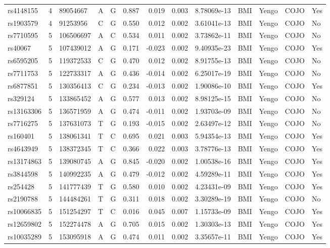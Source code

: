 \documentclass[11pt,twoside]{bristolthesis}
\begin{document}
\begin{longtable}[t]{lrlllrrrlllll}
rs4148155 & 4 & 89054667 & A & G & 0.887 & 0.019 & 0.003 & 8.78069e-13 & BMI & Yengo & COJO & Yes\\
rs1903579 & 4 & 91253956 & C & G & 0.550 & 0.012 & 0.002 & 3.61041e-13 & BMI & Yengo & COJO & No\\
\addlinespace
rs7710595 & 5 & 106506697 & A & C & 0.534 & 0.011 & 0.002 & 3.73862e-11 & BMI & Yengo & COJO & No\\
rs40067 & 5 & 107439012 & A & G & 0.171 & -0.023 & 0.002 & 9.40935e-23 & BMI & Yengo & COJO & Yes\\
rs6595205 & 5 & 119372533 & C & G & 0.470 & 0.012 & 0.002 & 8.91755e-13 & BMI & Yengo & COJO & No\\
rs7711753 & 5 & 122733317 & A & G & 0.436 & -0.014 & 0.002 & 6.25017e-19 & BMI & Yengo & COJO & No\\
rs6877851 & 5 & 130356413 & C & G & 0.234 & -0.013 & 0.002 & 1.90086e-10 & BMI & Yengo & COJO & Yes\\
\addlinespace
rs329124 & 5 & 133865452 & A & G & 0.577 & 0.013 & 0.002 & 8.98125e-15 & BMI & Yengo & COJO & No\\
rs13163306 & 5 & 136571959 & A & G & 0.474 & -0.011 & 0.002 & 1.93703e-09 & BMI & Yengo & COJO & No\\
rs7716275 & 5 & 137631073 & T & G & 0.193 & -0.015 & 0.002 & 2.63497e-12 & BMI & Yengo & COJO & No\\
rs160401 & 5 & 138061341 & T & C & 0.695 & 0.021 & 0.003 & 5.94354e-13 & BMI & Yengo & COJO & Yes\\
rs4643949 & 5 & 138372345 & T & C & 0.366 & 0.022 & 0.003 & 3.78776e-13 & BMI & Yengo & COJO & Yes\\
\addlinespace
rs13174863 & 5 & 139080745 & A & G & 0.845 & -0.020 & 0.002 & 1.00538e-16 & BMI & Yengo & COJO & Yes\\
rs3844598 & 5 & 140992235 & A & G & 0.479 & -0.012 & 0.002 & 4.59289e-11 & BMI & Yengo & COJO & Yes\\
rs254428 & 5 & 141777439 & T & G & 0.580 & 0.010 & 0.002 & 4.23431e-09 & BMI & Yengo & COJO & Yes\\
rs2190788 & 5 & 144484261 & T & G & 0.311 & 0.018 & 0.002 & 3.30289e-19 & BMI & Yengo & COJO & No\\
rs10066835 & 5 & 151254297 & T & C & 0.016 & 0.045 & 0.007 & 1.15733e-09 & BMI & Yengo & COJO & Yes\\
\addlinespace
rs12659802 & 5 & 152274478 & A & G & 0.705 & 0.015 & 0.002 & 1.30303e-13 & BMI & Yengo & COJO & Yes\\
rs10035289 & 5 & 153095918 & A & G & 0.474 & 0.011 & 0.002 & 3.35657e-11 & BMI & Yengo & COJO & Yes\\

\end{longtable}
\end{document}
